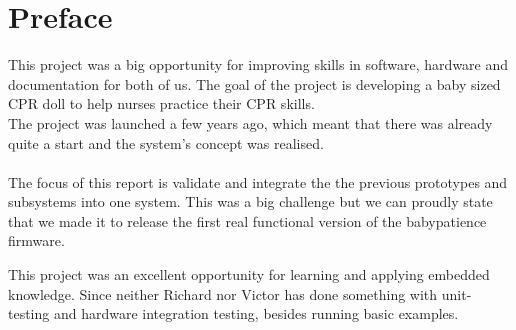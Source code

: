 \chapter*{Preface}
This project was a big opportunity for improving skills in software, hardware and documentation for both of us. The goal of the project is developing a baby sized CPR doll to help nurses practice their CPR skills.\\ The project was launched a few years ago, which meant that there was already quite a start and the system's concept was realised. \\
\\The focus of this report is validate and integrate the the previous prototypes and subsystems into one system. This was a big challenge but we can proudly state that we made it to release the first real functional version of the babypatience firmware.

This project was an excellent opportunity for learning and applying embedded knowledge. Since neither Richard nor Victor has done something with unit-testing and hardware integration testing, besides running basic examples. 
